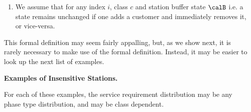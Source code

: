 \begin{enumerate}
  \item We assume that for any index $i$, class $c$ and
  station buffer state $\calB$
  \be
         \label{eq-q-sym-whi}
  \ee
%
i.e. a state remains unchanged if one adds a customer
 and immediately removes it, or vice-versa.
\end{enumerate}

This formal definition may seem fairly appalling,
but, as we show next, it is rarely necessary to
make use of the formal definition. Instead, it
may be easier to look up the next list of
examples.

\textbf{\sc Examples of Insensitive Stations.}

For each of these examples, the service
requirement distribution may be any phase type
distribution, and may be class dependent.

